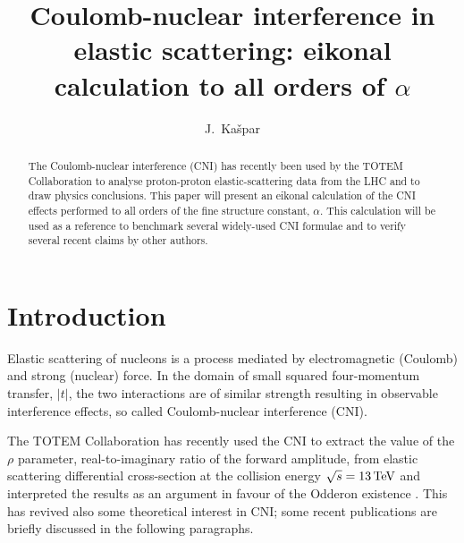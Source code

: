 \documentclass{appolb}
\def\un#1{\,{\rm #1}}
\begin{document}
\title{Coulomb-nuclear interference in elastic scattering: eikonal calculation to all orders of $\alpha$}

\author{
	J.~Ka\v spar
		\address{
			Institute of Physics of the Academy of Sciences of the Czech Republic, Prague, Czech Republic
			and CERN, Geneva, Switzerland.
		}
}

\maketitle

\begin{abstract}
The Coulomb-nuclear interference (CNI) has recently been used by the TOTEM Collaboration to analyse proton-proton elastic-scattering data from the LHC and to draw physics conclusions. This paper will present an eikonal calculation of the CNI effects performed to all orders of the fine structure constant, $\alpha$. This calculation will be used as a reference to benchmark several widely-used CNI formulae and to verify several recent claims by other authors.
\end{abstract}





\section{Introduction}
\label{sec:introduction}

Elastic scattering of nucleons is a process mediated by electromagnetic (Coulomb) and strong (nuclear) force. In the domain of small squared four-momentum transfer, $|t|$, the two interactions are of similar strength resulting in observable interference effects, so called Coulomb-nuclear interference (CNI).

The TOTEM Collaboration has recently used the CNI to extract the value of the $\rho$ parameter, real-to-imaginary ratio of the forward amplitude, from elastic scattering differential cross-section at the collision energy $\sqrt s = 13\un{TeV}$ and interpreted the results as an argument in favour of the Odderon existence \cite{totem-13tev-rho}. This has revived also some theoretical interest in CNI; some recent publications are briefly discussed in the following paragraphs.
\end{document}
